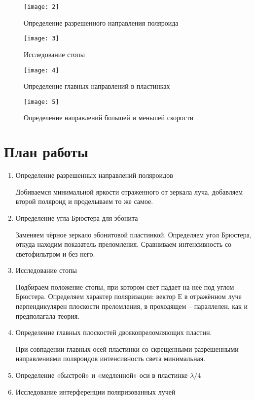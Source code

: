 \documentclass{letask}
\begin{document}
\begin{figure}[H]
\centering
\begin{minipage}[h]{0.24\linewidth}
\texttt{[image: 2]}
\label{1}
\caption{Определение разрешенного направления поляроида} 
\end{minipage}
\hfill 
\begin{minipage}[h]{0.24\linewidth}
\texttt{[image: 3]}
\label{2}
\caption{Исследование стопы}
\end{minipage}
\hfill 
\begin{minipage}[h]{0.24\linewidth}
\texttt{[image: 4]}
\label{3}
\caption{Определение главных направлений в пластинках}
\end{minipage}
\hfill 
\begin{minipage}[h]{0.24\linewidth}
\texttt{[image: 5]}
\label{4}
\caption{Определение направлений большей и меньшей скорости}
\end{minipage}
\end{figure}

\section{План работы}

\begin{enumerate}
\item Определение разрешенных направлений поляроидов

Добиваемся минимальной яркости отраженного от зеркала луча, добавляем второй поляроид и проделываем то же самое.

\item Определение угла Брюстера для эбонита

Заменяем чёрное зеркало эбонитовой пластинкой. Определяем угол Брюстера, откуда находим показатель преломления. Сравниваем интенсивность со светофильтром и без него.

\item Исследование стопы

Подбираем положение стопы, при котором свет падает на неё под углом Брюстера. Определяем характер поляризации: вектор Е в отражённом луче перпендикулярен плоскости преломления, в проходящем – параллелен, как и предполагала теория.

\item Определение главных плоскостей двоякопреломляющих пластин.

При совпадении главных осей пластинки со скрещенными разрешенными направлениями поляроидов интенсивность света минимальная.

\item Определение «быстрой» и «медленной» оси в пластинке $\lambda/4$
\item Исследование интерференции поляризованных лучей

\end{enumerate}
\end{document}
